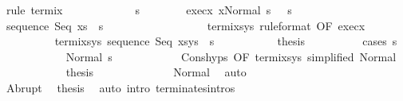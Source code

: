 \begin{isabellebody}
\ {\isacharparenleft}rule\ termi{\isacharunderscore}x{\isacharparenright}\isanewline
\ \ \ \ \isamarkupfalse%
\isanewline
\ \ \ \ \ \ \isamarkupfalse%
\ s{\isacharprime}\isanewline
\ \ \ \ \ \ \isamarkupfalse%
\ exec{\isacharunderscore}x{\isacharcolon}\ {\isachardoublequoteopen}{\isasymGamma}{\isasymturnstile}{\isasymlangle}x{\isacharcomma}Normal\ s\ {\isasymrangle}\ {\isasymRightarrow}\ s{\isacharprime}{\isachardoublequoteclose}\isanewline
\ \ \ \ \ \ \isamarkupfalse%
\ {\isachardoublequoteopen}{\isasymGamma}{\isasymturnstile}sequence\ Seq\ xs\ {\isasymdown}\ s{\isacharprime}{\isachardoublequoteclose}\isanewline
\ \ \ \ \ \ \isamarkupfalse%
\ {\isacharminus}\isanewline
\ \ \ \ \ \ \ \ \isamarkupfalse%
\ termi{\isacharunderscore}xs{\isacharunderscore}ys\ {\isacharbrackleft}rule{\isacharunderscore}format{\isacharcomma}\ OF\ exec{\isacharunderscore}x{\isacharbrackright}\isanewline
\ \ \ \ \ \ \ \ \isamarkupfalse%
\ termi{\isacharunderscore}xs{\isacharunderscore}ys{\isacharprime}{\isacharcolon}\ {\isachardoublequoteopen}{\isasymGamma}{\isasymturnstile}sequence\ Seq\ {\isacharparenleft}xs{\isacharat}ys{\isacharparenright}\ {\isasymdown}\ s{\isacharprime}{\isachardoublequoteclose}\ \isacommand{{\isachardot}}\isamarkupfalse%
\isanewline
\ \ \ \ \ \ \ \ \isamarkupfalse%
\ {\isacharquery}thesis\isanewline
\ \ \ \ \ \ \ \ \isamarkupfalse%
\ {\isacharparenleft}cases\ s{\isacharprime}{\isacharparenright}\isanewline
\ \ \ \ \ \ \ \ \ \ \isamarkupfalse%
\ {\isacharparenleft}Normal\ s{\isacharprime}{\isacharprime}{\isacharparenright}\isanewline
\ \ \ \ \ \ \ \ \ \ \isamarkupfalse%
\ Cons{\isachardot}hyps\ {\isacharbrackleft}OF\ termi{\isacharunderscore}xs{\isacharunderscore}ys{\isacharprime}\ {\isacharbrackleft}simplified\ Normal{\isacharbrackright}{\isacharbrackright}\isanewline
\ \ \ \ \ \ \ \ \ \ \isamarkupfalse%
\ {\isacharquery}thesis\isanewline
\ \ \ \ \ \ \ \ \ \ \ \ \isamarkupfalse%
\ Normal\ \isamarkupfalse%
\ auto\isanewline
\ \ \ \ \ \ \ \ \isamarkupfalse%
\isanewline
\ \ \ \ \ \ \ \ \ \ \isamarkupfalse%
\ Abrupt\ \isamarkupfalse%
\ {\isacharquery}thesis\ \isamarkupfalse%
\ {\isacharparenleft}auto\ intro{\isacharcolon}\ terminates{\isachardot}intros{\isacharparenright}\isanewline
\ \ \ \ \ \ \ \ \isamarkupfalse%
\isanewline
\ \ \ \ \ \ \ \ \ \ \isamarkupfalse%

\end{isabellebody}
